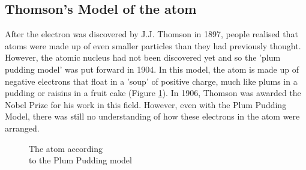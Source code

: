             \subsection*{Thomson's Model of the atom}
            \nopagebreak
\begin{minipage}{.5\textwidth}
        \label{m38756*id254616}After the electron was discovered by J.J. Thomson in 1897, people realised that atoms were made up of even smaller particles than they had previously thought. However, the atomic nucleus had not been discovered yet and so the 'plum pudding model' was put forward in 1904. In this model, the atom is made up of negative electrons that float in a 'soup' of positive charge, much like plums in a pudding or raisins in a fruit cake (Figure \ref{fig:atom:plumpudding}). In 1906, Thomson was awarded the Nobel Prize for his work in this field. However, even with the Plum Pudding Model, there was still no understanding of how these electrons in the atom were arranged.\par 
\end{minipage}
\begin{minipage}{.5\textwidth}
    \setcounter{subfigure}{0}
	\begin{figure}[H] %
    \begin{center}
\begin{minipage}{.8\textwidth}
\caption{The atom according \\ to the Plum Pudding model}
\end{minipage}
\label{fig:atom:plumpudding}
\end{center}
 \end{figure}    
\end{minipage}   
